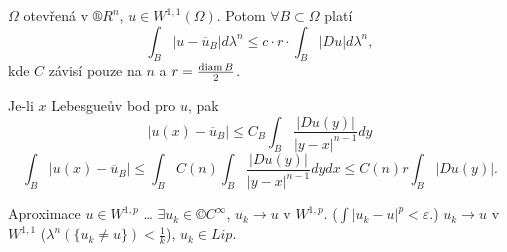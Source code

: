\documentclass[12pt]{article}					%
\begin{document}
\begin{veta}
	$Ω$ otevřená v $®R^n$, $u \in W^{1, 1}(Ω)$. Potom $\forall B \subset Ω$ platí
	$$ \int_B |u - \overline{u}_B| dλ^n ≤ c·r·\int_B |Du| dλ^n,  $$
	kde $C$ závisí pouze na $n$ a $r = \frac{\operatorname{diam} B}{2}$.

	\begin{dukazin}
		Je-li $x$ Lebesgueův bod pro $u$, pak
		$$ |u(x) - \overline{u}_B| ≤ C_B \int_B \frac{|Du(y)|}{|y - x|^{n - 1}} dy $$
		$$ \int_B |u(x) - \overline{u}_B| ≤ \int_B C(n) \int_B \frac{|D u(y)|}{|y - x|^{n - 1}} dy dx ≤ C(n) r \int_B |Du(y)|. $$
	\end{dukazin}
\end{veta}

\begin{poznamka}
	Aproximace $u \in W^{1, p}$ … $\exists u_k \in ©C^∞$, $u_k \rightarrow u$ v $W^{1, p}$. ($\int |u_k - u|^p < ε$.) $u_k \rightarrow u$ v $W^{1, 1}$ ($λ^n(\{u_k ≠ u\}) < \frac{1}{k}$), $u_k \in Lip$.
\end{poznamka}
\end{document}
